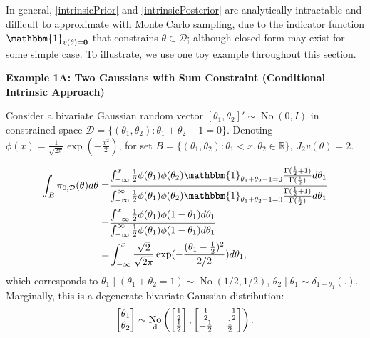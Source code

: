 \documentclass[10pt]{article}
\newcommand{\mc}[1]{\mathcal{#1}}
\DeclareMathOperator{\No}{No}
\DeclareMathOperator{\1}{\mathbbm{1}}
\begin{document}
In general, \eqref{intrinsicPrior} and \eqref{intrinsicPosterior} are analytically intractable and difficult to approximate with Monte Carlo sampling, due to the indicator function $\mathbbm{1}_{v({\theta})={\bf 0}}$ that constrains $\theta\in \mc D$; although closed-form may exist for some simple case. To illustrate, we use one toy example throughout this section.

{\bf Example 1A: Two Gaussians with Sum Constraint (Conditional Intrinsic Approach)}

Consider a bivariate Gaussian random vector $[\theta_1,\theta_2]' \sim \No(0,I)$ in constrained space $\mc D=\{(\theta_1,\theta_2):\theta_1+\theta_2-1=0\}$. Denoting $\phi(x)= \frac{1}{\sqrt{2\pi}} \exp(-\frac{x^2}{2})$, for set $B= \{(\theta_1,\theta_2): \theta_1< x, \theta_2\in \mathbb R\}$, $J_2v(\theta)=2$.

\begin{equation*}
	\begin{aligned}
\int_{B} \pi_{0,\mc D}(\theta) d\theta= 
& \frac{
\int_{-\infty}^{x} \frac{1}{2}\phi(\theta_1)\phi(\theta_2)\mathbbm{1}_{\theta_1+\theta_2-1=0} \frac{\Gamma(\frac{1}{2}+1)}{\Gamma(\frac{1}{2})}  d\theta_1  
}{\int_{-\infty}^{\infty}\frac{1}{2}\phi(\theta_1)\phi(\theta_2) \mathbbm{1}_{\theta_1+\theta_2-1=0}  \frac{\Gamma(\frac{1}{2}+1)}{\Gamma(\frac{1}{2})}   d\theta_1} \\ 
=& \frac{
\int_{-\infty}^{x}\frac{1}{2}\phi(\theta_1)\phi(1-\theta_1)d\theta_1  
}{
\int_{-\infty}^{\infty}\frac{1}{2}\phi(\theta_1)\phi(1-\theta_1)d\theta_1  } \\ 
= & \int_{-\infty}^{x} \frac{\sqrt{2}}{\sqrt{2\pi}} \exp(-\frac{(\theta_1-\frac{1}{2})^2}{2/2}) d\theta_1,
\end{aligned}
\end{equation*}
which corresponds to $\theta_1\mid (\theta_1+ \theta_2=1) \sim \No(1/2,1/2)$, $\theta_2\mid \theta_1 \sim \delta_{1-\theta_1}(.)$. Marginally, this is a degenerate bivariate Gaussian distribution:
$$\begin{bmatrix} \theta_1 \\ \theta_2 \end{bmatrix} \sim
\No_{\text d} \left(
 \begin{bmatrix} \frac{1}{2} \\ \frac{1}{2} \end{bmatrix},
\begin{bmatrix} \frac{1}{2} & -\frac{1}{2}  \\  -\frac{1}{2}  & \frac{1}{2} \end{bmatrix}
\right).$$
\end{document}
